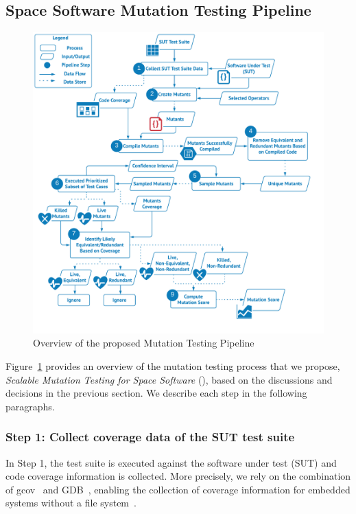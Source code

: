 \subsection{Space Software Mutation Testing Pipeline}
\label{sec:approach}

\begin{figure}[tb]
\begin{center}
\includegraphics[width=13cm]{images/MT}
\caption{Overview of the proposed Mutation Testing Pipeline}
\label{fig:approach}
\end{center}
\end{figure}

Figure~\ref{fig:approach} provides an overview of the mutation testing process that we propose, 
\emph{Scalable Mutation Testing for Space Software} (\APPR), based on the discussions and decisions in the previous section. We describe each step in the following paragraphs. 

\subsubsection{Step 1: Collect coverage data of the SUT test suite}

In Step 1, the test suite is executed against the software under test (SUT) and code coverage information is collected. 
More precisely, we rely on the combination of gcov~\cite{GCOV}
and GDB~\cite{GDB}, enabling the collection of coverage information for embedded systems without a file system~\cite{THANASSIS}.


